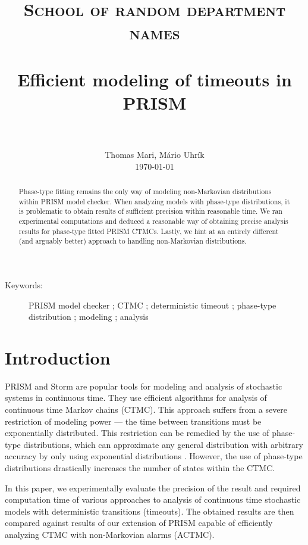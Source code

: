 \documentclass{article}
\title{
	\usefont{OT1}{bch}{b}{n}
	\normalfont \normalsize \textsc{School of random department names} \\ [25pt]
	\horrule{0.5pt} \\[0.4cm]
	\huge Efficient modeling of timeouts in PRISM \\
	\horrule{2pt} \\[0.5cm]
}
\author{
	\normalfont 								\normalsize
	Thomas Mari, M\'{a}rio Uhr\'{i}k\\[-3pt]		\normalsize
	\today
}
\date{}
\numberwithin{equation}{section}		%
\numberwithin{figure}{section}			%
\numberwithin{table}{section}				%
\begin{document}
	\maketitle

	\begin{abstract}
		Phase-type fitting remains the only way of modeling non-Markovian distributions within PRISM model checker.
		When analyzing models with phase-type distributions, it is problematic to obtain results of sufficient precision within reasonable time.
		We ran experimental computations and deduced a reasonable way of obtaining precise analysis results for phase-type fitted PRISM CTMCs.
		Lastly, we hint at an entirely different (and arguably better) approach to handling non-Markovian distributions.
	\end{abstract}
	
	\begin{description}
		
		\item[Keywords:] 	PRISM model checker ; CTMC ; deterministic timeout ; phase-type distribution ; modeling ; analysis
		
	\end{description}
	
	
	
	\section{Introduction}
	\label{intro}
	
	PRISM \cite{KNP11} and Storm \cite{DBLP:journals/corr/DehnertJK017} are popular tools for modeling and analysis of stochastic systems in continuous time. They use efficient algorithms for analysis of continuous time Markov chains (CTMC). This approach suffers from a severe restriction of modeling power --- the time between transitions must be exponentially distributed. This restriction can be remedied by the use of phase-type distributions, which can approximate any general distribution with arbitrary accuracy by only using exponential distributions \cite{Buchholz:2014:IMP:2683922}. However, the use of phase-type distributions drastically increases the number of states within the CTMC.
	
	In this paper, we experimentally evaluate the precision of the result and required computation time of various approaches to analysis of continuous time stochastic models with deterministic transitions (timeouts). The obtained results are then compared against results of our extension of PRISM capable of efficiently analyzing CTMC with non-Markovian alarms (ACTMC).
	
\end{document}

